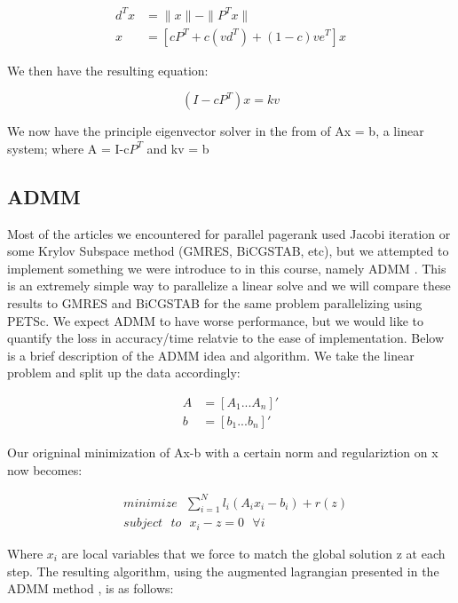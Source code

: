\documentclass[a4paper,10pt]{article}
\begin{document}
\begin{center}
\begin{align}
  d^{T}x &= \| x\| - \| P^{T}x\| \\
  x &= [cP^{T} + c(vd^{T}) + (1-c)ve^{T}]x
\end{align}
\end{center}

We then have the resulting equation:

\begin{center}
\begin{equation}
  (I-cP^{T})x = kv
\end{equation}
\end{center}
We now have the principle eigenvector solver in the from of Ax = b, a linear system; where A = I-c$P^{T}$ and kv = b



\subsection{ADMM}

Most of the articles we encountered for parallel pagerank used Jacobi iteration or some Krylov Subspace method (GMRES, BiCGSTAB, etc), but we attempted to implement something we were introduce to in this course, namely ADMM \cite{ADMM}. This is an extremely simple way to parallelize a linear solve and we will compare these results to GMRES and BiCGSTAB for the same problem parallelizing using PETSc. We expect ADMM to have worse performance, but we would like to quantify the loss in accuracy/time relatvie to the ease of implementation.
\newline
\linebreak
Below is a brief description of the ADMM idea and algorithm.
\newline
We take the linear problem and split up the data accordingly:
\begin{center}
\begin{align}
	A &= \left[ A_{1} ... A_{n} \right]' \\
	b &= \left[ b_{1} ... b_{n} \right]' 
\end{align}
\end{center}
Our origninal minimization of Ax-b with a certain norm and regulariztion on x now becomes:

\begin{center}
\begin{align}
	&minimize \: \: \: \sum_{i=1}^{N} l_{i}(A_{i}x_{i} - b_{i}) + r(z) \\
	&subject \: \: \: to \: \: \: x_{i} - z = 0 \: \: \: \forall i
\end{align}
\end{center}
Where $x_{i}$ are local variables that we force to match the global solution z at each step.
\newline
The resulting algorithm, using the augmented lagrangian presented in the ADMM method \cite{ADMM}, is as follows:
\end{document}
